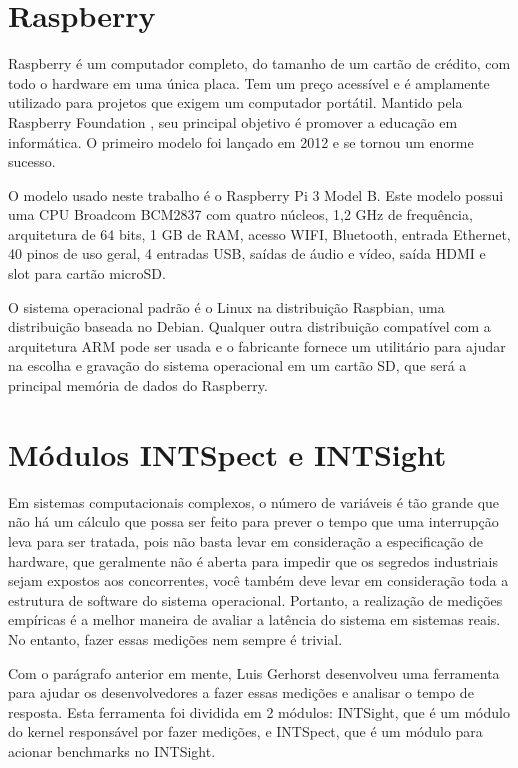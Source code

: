 \section{Raspberry}

Raspberry é um computador completo, do tamanho de um cartão de crédito, com todo o hardware em uma única placa. Tem um preço acessível e é amplamente utilizado para projetos que exigem um computador portátil. Mantido pela Raspberry Foundation \cite{RPF2019}, seu principal objetivo é promover a educação em informática. O primeiro modelo foi lançado em 2012 e se tornou um enorme sucesso.

O modelo usado neste trabalho é o Raspberry Pi 3 Model B. Este modelo possui uma CPU Broadcom BCM2837 com quatro núcleos, 1,2 GHz de frequência, arquitetura de 64 bits, 1 GB de RAM, acesso WIFI, Bluetooth, entrada Ethernet, 40 pinos de uso geral, 4 entradas USB, saídas de áudio e vídeo, saída HDMI e slot para cartão microSD.

O sistema operacional padrão é o Linux na distribuição Raspbian, uma distribuição baseada no Debian. Qualquer outra distribuição compatível com a arquitetura ARM pode ser usada e o fabricante fornece um utilitário para ajudar na escolha e gravação do sistema operacional em um cartão SD, que será a principal memória de dados do Raspberry.

\section{Módulos INTSpect e INTSight}

Em sistemas computacionais complexos, o número de variáveis é tão grande que não há um cálculo que possa ser feito para prever o tempo que uma interrupção leva para ser tratada, pois não basta levar em consideração a especificação de hardware, que geralmente não é aberta para impedir que os segredos industriais sejam expostos aos concorrentes, você também deve levar em consideração toda a estrutura de software do sistema operacional. Portanto, a realização de medições empíricas é a melhor maneira de avaliar a latência do sistema em sistemas reais. No entanto, fazer essas medições nem sempre é trivial.

Com o parágrafo anterior em mente, Luis Gerhorst \cite{Gerhorst2018} desenvolveu uma ferramenta para ajudar os desenvolvedores a fazer essas medições e analisar o tempo de resposta. Esta ferramenta foi dividida em 2 módulos: INTSight, que é um módulo do kernel responsável por fazer medições, e INTSpect, que é um módulo para acionar benchmarks no INTSight.

